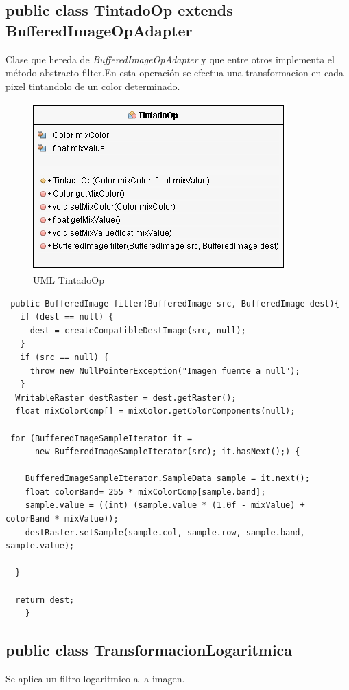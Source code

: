\subsection*{public class TintadoOp extends BufferedImageOpAdapter}
Clase que hereda de \emph{BufferedImageOpAdapter} y que entre otros implementa el método abstracto filter.En esta operación se efectua una transformacion en cada pixel tintandolo de un color determinado.

\begin{figure}[H]
  \centering
    \includegraphics[scale=0.75]{images/tintado}
  \caption{UML TintadoOp}
  \label{UML TintadoOp}
\end{figure}

\begin{lstlisting}
 public BufferedImage filter(BufferedImage src, BufferedImage dest){
   if (dest == null) {
     dest = createCompatibleDestImage(src, null);
   }
   if (src == null) {
     throw new NullPointerException("Imagen fuente a null");
   }
  WritableRaster destRaster = dest.getRaster();
  float mixColorComp[] = mixColor.getColorComponents(null);

 for (BufferedImageSampleIterator it = 
      new BufferedImageSampleIterator(src); it.hasNext();) {
           
    BufferedImageSampleIterator.SampleData sample = it.next();
    float colorBand= 255 * mixColorComp[sample.band];
    sample.value = ((int) (sample.value * (1.0f - mixValue) + colorBand * mixValue));
    destRaster.setSample(sample.col, sample.row, sample.band, sample.value);
            
  }

  return dest;
    }
\end{lstlisting}  

\subsection*{public class TransformacionLogaritmica}
Se aplica un filtro logaritmico a la imagen.

